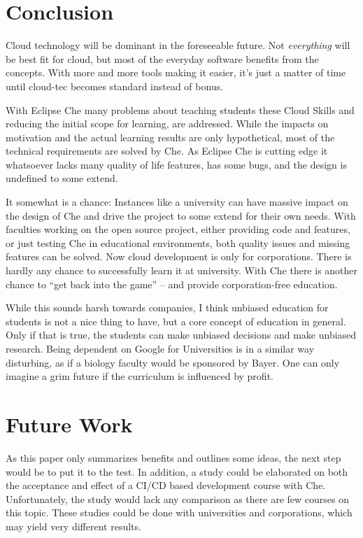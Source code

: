 \documentclass[utf8]{lni}
\begin{document}
\section{Conclusion}
\label{sec:Conclusion}
Cloud technology will be dominant in the foreseeable future. 
Not \textit{everything} will be best fit for cloud, but most of the everyday software benefits from the concepts. 
With more and more tools making it easier, it's just a matter of time until cloud-tec becomes standard instead of bonus.

With Eclipse Che many problems about teaching students these Cloud Skills and reducing the initial scope for learning, are addressed. 
While the impacts on motivation and the actual learning results are only hypothetical, most of the technical requirements are solved by Che.  
As Eclipse Che is cutting edge it whatsoever lacks many quality of life features, has some bugs, and the design is undefined to some extend. 

It somewhat is a chance: 
Instances like a university can have massive impact on the design of Che and drive the project to some extend for their own needs. 
With faculties working on the open source project, either providing code and features, or just testing Che in educational environments, both quality issues and missing features can be solved.    
Now cloud development is only for corporations. 
There is hardly any chance to successfully learn it at university. 
With Che there is another chance to “get back into the game” – and provide corporation-free education.  

While this sounds harsh towards companies, I think unbiased education for students is not a nice thing to have, but a core concept of education in general. 
Only if that is true, the students can make unbiased decisions and make unbiased research. 
Being dependent on Google for Universities is in a similar way disturbing, as if a biology faculty would be sponsored by Bayer. 
One can only imagine a grim future if the curriculum is influenced by profit. 
\section*{Future Work}
\label{sec:FutureWork}
As this paper only summarizes benefits and outlines some ideas, the next step would be to put it to the test.
In addition, a study could be elaborated on both the acceptance and effect of a CI/CD based development course with Che. 
Unfortunately, the study would lack any comparison as there are few courses on this topic. 
These studies could be done with universities and corporations, which 
may yield very different results.   


\end{document}
